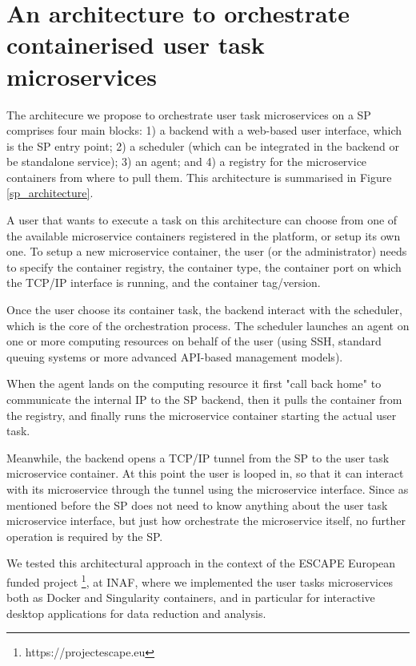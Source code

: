 \documentclass[11pt,twoside]{article}
\begin{document}
\section{An architecture to orchestrate containerised user task microservices}
The architecure we propose to orchestrate user task microservices on a SP comprises four main blocks: 1) a backend with a web-based user interface, which is the SP entry point; 2) a scheduler (which can be integrated in the backend or be standalone service); 3) an agent; and 4) a registry for the microservice containers from where to pull them. This architecture is summarised in Figure \ref{sp_architecture}.


A user that wants to execute a task on this architecture can choose from one of the available microservice containers registered in the platform, or setup its own one. To setup a new microservice container, the user (or the administrator) needs to specify the container registry, the container type, the container port on which the TCP/IP interface is running, and the container tag/version.

Once the user choose its container task, the backend interact with the scheduler, which is the core of the orchestration process. The scheduler launches an agent on one or more computing resources on behalf of the user (using SSH, standard queuing systems or more advanced API-based management models).

When the agent lands on the computing resource it first "call back home" to communicate the internal IP to the SP backend, then it pulls the container from the registry, and finally runs the microservice container starting the actual user task.

Meanwhile, the backend opens a TCP/IP tunnel from the SP to the user task microservice container. At this point the user is looped in, so that it can interact with its microservice through the tunnel using the microservice interface. Since as mentioned before the SP does not need to know anything about the user task microservice interface, but just how orchestrate the microservice itself, no further operation is required by the SP.

We tested this architectural approach in the context of the ESCAPE European funded project \footnote{https://projectescape.eu}, at INAF, where we implemented the user tasks microservices both as Docker and Singularity containers, and in particular for interactive desktop applications for data reduction and analysis.
\end{document}
